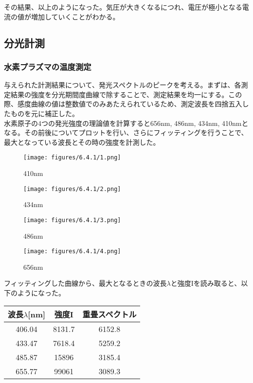 \documentclass{ltjsarticle}
\begin{document}
その結果、以上のようになった。気圧が大きくなるにつれ、電圧が極小となる電流の値が増加していくことがわかる。

\subsection{分光計測}
\subsubsection{水素プラズマの温度測定}
与えられた計測結果について、発光スペクトルのピークを考える。まずは、各測定結果の強度を分光期間度曲線で除することで、測定結果を均一にする。この際、感度曲線の値は整数値でのみあたえられているため、測定波長を四捨五入したものを元に補正した。\\

水素原子の4つの発光強度の理論値を計算すると656nm, 486nm, 434nm, 410nmとなる。その前後についてプロットを行い、さらにフィッティングを行うことで、最大となっている波長とその時の強度を計測した。

\begin{figure}[H]
    \centering
    \begin{minipage}[b]{0.48\textwidth}
      \texttt{[image: figures/6.4.1/1.png]}
      \caption{410nm}
    \end{minipage}
    \hfill
    \begin{minipage}[b]{0.48\textwidth}
      \texttt{[image: figures/6.4.1/2.png]}
      \caption{434nm}
    \end{minipage}
\end{figure}

\begin{figure}[H]
    \centering
    \begin{minipage}[b]{0.48\textwidth}
      \texttt{[image: figures/6.4.1/3.png]}
      \caption{486nm}
    \end{minipage}
    \hfill
    \begin{minipage}[b]{0.48\textwidth}
      \texttt{[image: figures/6.4.1/4.png]}
      \caption{656nm}
    \end{minipage}
\end{figure}

フィッティングした曲線から、最大となるときの波長$\lambda$と強度Iを読み取ると、以下のようになった。

\begin{table}[H]
    \begin{center}
        \begin{tabular}{|c|c|c|} \hline
            波長$\lambda$[nm] & 強度I & 重畳スペクトル \\ \hline
            406.04 & 8131.7 & 6152.8 \\ \hline
            433.47 & 7618.4 & 5259.2 \\ \hline
            485.87 & 15896 & 3185.4 \\ \hline
            655.77 & 99061 & 3089.3 \\ \hline
        \end{tabular}
    \end{center}
\end{table}
\end{document}
